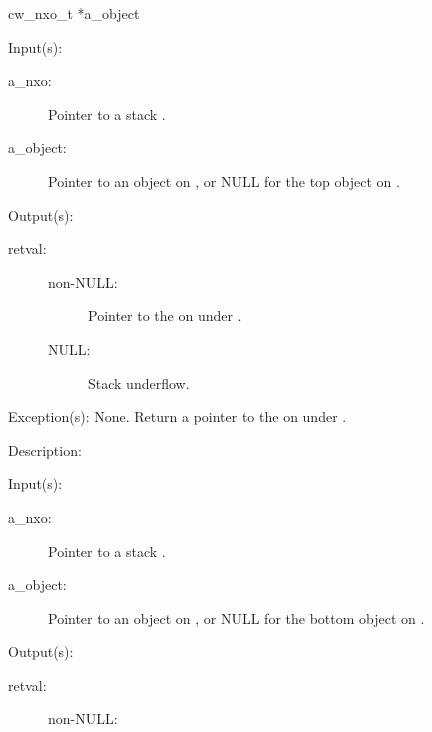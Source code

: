 \begin{capi}
{{cw\_nxo\_t *a\_object}}
	\begin{capilist}
	\item[Input(s): ]
		\begin{description}\item[]
		\item[a\_nxo: ]
			Pointer to a stack .
		\item[a\_object: ]
			Pointer to an object on , or NULL for the
			top object on .
		\end{description}
	\item[Output(s): ]
		\begin{description}\item[]
		\item[retval: ]
			\begin{description}\item[]
			\item[non-NULL: ]
				Pointer to the  on  under
				.
			\item[NULL: ]
				Stack underflow.
			\end{description}
		\end{description}
	\item[Exception(s): ] None.
		Return a pointer to the  on  under
		.
	\item[Description: ]
	\end{capilist}
\label{nxo_stack_up_get}
	\begin{capilist}
	\item[Input(s): ]
		\begin{description}\item[]
		\item[a\_nxo: ]
			Pointer to a stack \classname{nxo}.
		\item[a\_object: ]
			Pointer to an object on , or NULL for the
			bottom object on \cvar{a\_nxo}.
		\end{description}
	\item[Output(s): ]
		\begin{description}\item[]
		\item[retval: ]
			\begin{description}\item[]
			\item[non-NULL: ]

\end{description}
\end{description}
\end{capilist}
\end{capi}
